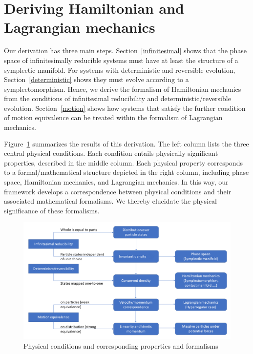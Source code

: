 \documentclass[12pt, english, twoside]{article} %
\begin{document}
\section{Deriving Hamiltonian and Lagrangian mechanics}
\label{derivation}


Our derivation has three main steps. Section~\ref{infinitesimal} shows that the phase space of infinitesimally reducible systems must have at least the structure of a symplectic manifold. For systems with deterministic and reversible evolution, Section~\ref{deterministic} shows they must evolve according to a symplectomorphism. Hence, we derive the formalism of Hamiltonian mechanics from the conditions of infinitesimal reducibility and deterministic/reversible evolution. Section~\ref{motion} shows how systems that satisfy the further condition of motion equivalence can be treated within the formalism of Lagrangian mechanics. 


Figure~\ref{diagram} summarizes the results of this derivation. The left column lists the three central physical conditions. Each condition entails physically significant properties, described in the middle column. Each physical property corresponds to a formal/mathematical structure depicted in the right column, including phase space, Hamiltonian mechanics, and Lagrangian mechanics. In this way, our framework develops a correspondence between physical conditions and their associated mathematical formalisms. We thereby elucidate the physical significance of these formalisms.

\begin{figure}[h]
	\centering
	\includegraphics[width=\textwidth]{Diagram.png}
\caption{Physical conditions and corresponding properties and formalisms}
\label{diagram}
\end{figure}
\end{document}
